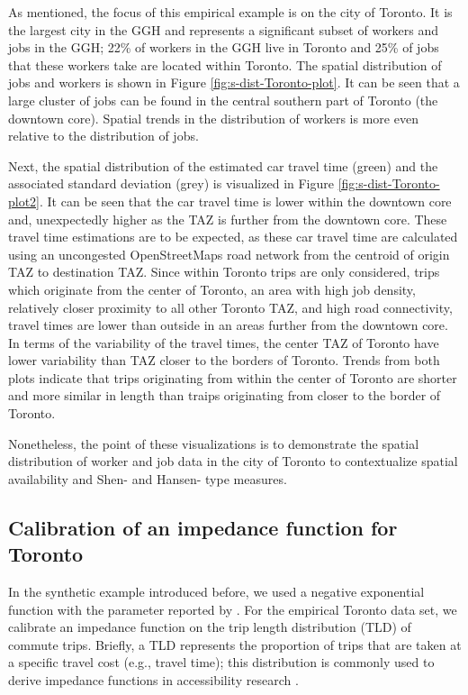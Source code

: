 \documentclass[]{elsarticle} %
\begin{document}
As mentioned, the focus of this empirical example is on the city of
Toronto. It is the largest city in the GGH and represents a significant
subset of workers and jobs in the GGH; 22\% of workers in the GGH live
in Toronto and 25\% of jobs that these workers take are located within
Toronto. The spatial distribution of jobs and workers is shown in Figure
\ref{fig:s-dist-Toronto-plot}. It can be seen that a large cluster of
jobs can be found in the central southern part of Toronto (the downtown
core). Spatial trends in the distribution of workers is more even
relative to the distribution of jobs.

Next, the spatial distribution of the estimated car travel time (green)
and the associated standard deviation (grey) is visualized in Figure
\ref{fig:s-dist-Toronto-plot2}. It can be seen that the car travel time
is lower within the downtown core and, unexpectedly higher as the TAZ is
further from the downtown core. These travel time estimations are to be
expected, as these car travel time are calculated using an uncongested
OpenStreetMaps road network from the centroid of origin TAZ to
destination TAZ. Since within Toronto trips are only considered, trips
which originate from the center of Toronto, an area with high job
density, relatively closer proximity to all other Toronto TAZ, and high
road connectivity, travel times are lower than outside in an areas
further from the downtown core. In terms of the variability of the
travel times, the center TAZ of Toronto have lower variability than TAZ
closer to the borders of Toronto. Trends from both plots indicate that
trips originating from within the center of Toronto are shorter and more
similar in length than traips originating from closer to the border of
Toronto.

Nonetheless, the point of these visualizations is to demonstrate the
spatial distribution of worker and job data in the city of Toronto to
contextualize spatial availability and Shen- and Hansen- type measures.

\hypertarget{calibration-of-an-impedance-function-for-toronto}{%
\subsection{Calibration of an impedance function for
Toronto}\label{calibration-of-an-impedance-function-for-toronto}}

In the synthetic example introduced before, we used a negative
exponential function with the parameter reported by \citet{shen1998}.
For the empirical Toronto data set, we calibrate an impedance function
on the trip length distribution (TLD) of commute trips. Briefly, a TLD
represents the proportion of trips that are taken at a specific travel
cost (e.g., travel time); this distribution is commonly used to derive
impedance functions in accessibility research
\citep{lopez_2017_spatial, horbachov_theoretical_2018, batista_estimation_2019}.
\end{document}
